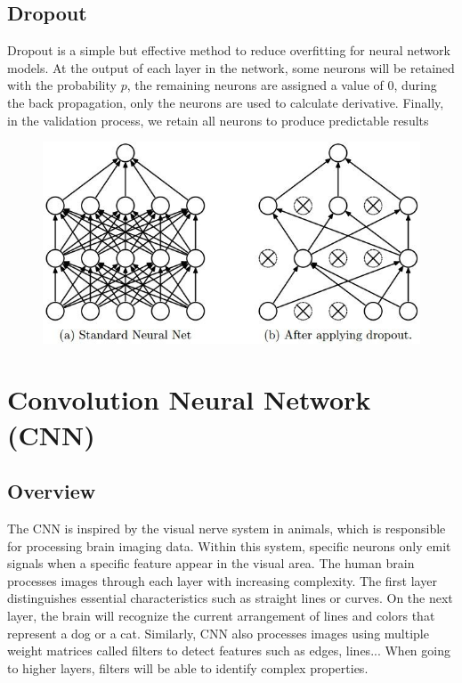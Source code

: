 \subsection{Dropout}
Dropout \cite{Srivastava:2014:DSW:2627435.2670313} is a simple but effective method to reduce overfitting for neural network models.
At the output of each layer in the network, some neurons will be retained with the probability $p$, the remaining neurons are assigned a value of 0, during the back propagation, only the neurons are used to calculate derivative. Finally, in the validation process, we retain all neurons to produce predictable results
\begin{center}
	\begin{figure}[H]
		\centering
		\includegraphics[width=0.75\columnwidth]{images/chap2/dropout.jpg}
		\label{chap2:dropout}
	\end{figure}
\end{center}
\vspace{-1cm}
\section{Convolution Neural Network (CNN)}
\subsection{Overview}
The CNN is inspired by the visual nerve system in animals, which is responsible for processing brain imaging data. Within this system, specific neurons only emit signals when a specific feature appear in the visual area. The human brain processes images through each layer with increasing complexity. The first layer distinguishes essential characteristics such as straight lines or curves. On the next layer, the brain will recognize the current arrangement of lines and colors that represent a dog or a cat. Similarly, CNN also processes images using multiple weight matrices called filters to detect features such as edges, lines... When going to higher layers, filters will be able to identify complex properties.

